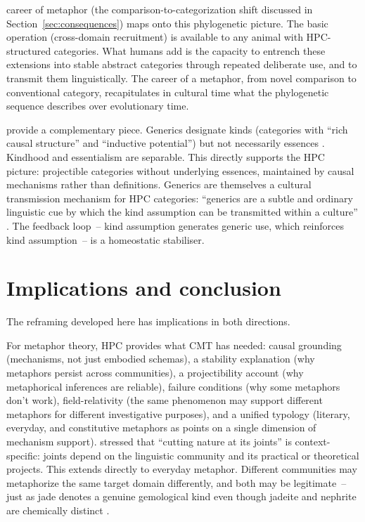\documentclass[12pt]{article}
\begin{document}
 career of metaphor (the comparison-to-categorization shift discussed in Section~\ref{sec:consequences}) maps onto this phylogenetic picture. The basic operation (cross-domain recruitment) is available to any animal with HPC-structured categories. What humans add is the capacity to entrench these extensions into stable abstract categories through repeated deliberate use, and to transmit them linguistically. The career of a metaphor, from novel comparison to conventional category, recapitulates in cultural time what the phylogenetic sequence describes over evolutionary time.

\textcite{noyes2019} provide a complementary piece. Generics designate kinds (categories with \enquote{rich causal structure} and \enquote{inductive potential}) but not necessarily essences \citep[2]{noyes2019}. Kindhood and essentialism are separable. This directly supports the HPC picture: projectible categories without underlying essences, maintained by causal mechanisms rather than definitions. Generics are themselves a cultural transmission mechanism for HPC categories: \enquote{generics are a subtle and ordinary linguistic cue by which the kind assumption can be transmitted within a culture} \citep[5]{noyes2019}. The feedback loop~-- kind assumption generates generic use, which reinforces kind assumption~-- is a homeostatic stabiliser.

\section{Implications and conclusion}
\label{sec:conclusion}

The reframing developed here has implications in both directions.

For metaphor theory, HPC provides what CMT has needed: causal grounding (mechanisms, not just embodied schemas), a stability explanation (why metaphors persist across communities), a projectibility account (why metaphorical inferences are reliable), failure conditions (why some metaphors don't work), field-relativity (the same phenomenon may support different metaphors for different investigative purposes), and a unified typology (literary, everyday, and constitutive metaphors as points on a single dimension of mechanism support). \textcite[532]{boyd1979} stressed that \enquote{cutting nature at its joints} is context-specific: joints depend on the linguistic community and its practical or theoretical projects. This extends directly to everyday metaphor. Different communities may metaphorize the same target domain differently, and both may be legitimate~-- just as jade denotes a genuine gemological kind even though jadeite and nephrite are chemically distinct \citep[515]{boyd1979}.
\end{document}
